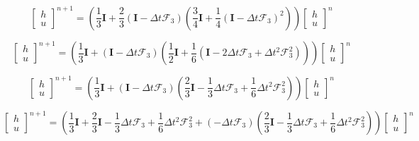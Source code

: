 \documentclass[12pt]{article}
\begin{document}
\[\left[\begin{array}{c}
h \\ u
\end{array}\right]^{n+1} = \left(\frac{1}{3}\boldsymbol{I} +  \frac{2}{3}(\boldsymbol{I} - \Delta t\boldsymbol{\mathcal{F}}_3 )\left(\frac{3}{4}\boldsymbol{I}  +  \frac{1}{4}\left(\boldsymbol{I} - \Delta t\boldsymbol{\mathcal{F}}_3 \right)^2\right) \right)\left[\begin{array}{c}
h \\ u
\end{array}\right]^n\]

\[\left[\begin{array}{c}
h \\ u
\end{array}\right]^{n+1} = \left(\frac{1}{3}\boldsymbol{I} + (\boldsymbol{I} - \Delta t\boldsymbol{\mathcal{F}}_3 )\left(\frac{1}{2}\boldsymbol{I}  +  \frac{1}{6}\left(\boldsymbol{I} - 2\Delta t\boldsymbol{\mathcal{F}}_3 + \Delta t^2\boldsymbol{\mathcal{F}}_3^2 \right)\right) \right)\left[\begin{array}{c}
h \\ u
\end{array}\right]^n\]

\[\left[\begin{array}{c}
h \\ u
\end{array}\right]^{n+1} = \left(\frac{1}{3}\boldsymbol{I} + (\boldsymbol{I} - \Delta t\boldsymbol{\mathcal{F}}_3 )\left(\frac{2}{3}\boldsymbol{I}  -  \frac{1}{3}\Delta t\boldsymbol{\mathcal{F}}_3 + \frac{1}{6}\Delta t^2\boldsymbol{\mathcal{F}}_3^2 \right) \right)\left[\begin{array}{c}
h \\ u
\end{array}\right]^n\]

\[\left[\begin{array}{c}
h \\ u
\end{array}\right]^{n+1} = \left(\frac{1}{3}\boldsymbol{I} + \frac{2}{3}\boldsymbol{I}  -  \frac{1}{3}\Delta t\boldsymbol{\mathcal{F}}_3 + \frac{1}{6}\Delta t^2\boldsymbol{\mathcal{F}}_3^2 + (- \Delta t\boldsymbol{\mathcal{F}}_3 )\left(\frac{2}{3}\boldsymbol{I}  -  \frac{1}{3}\Delta t\boldsymbol{\mathcal{F}}_3 + \frac{1}{6}\Delta t^2\boldsymbol{\mathcal{F}}_3^2 \right) \right)\left[\begin{array}{c}
h \\ u
\end{array}\right]^n\]
\end{document}
